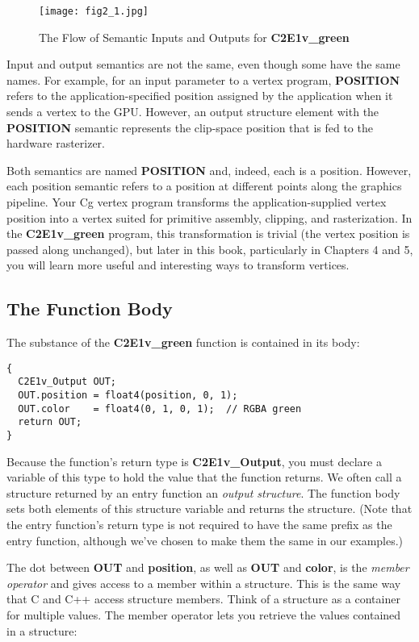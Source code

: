 \documentclass[../main.tex]{subfiles}
\begin{document}
\begin{figure}
    \centering
    \texttt{[image: fig2\_1.jpg]}
    \caption{The Flow of Semantic Inputs and Outputs for \textbf{C2E1v_green}}
    \label{fig:2-1}
\end{figure}

Input and output semantics are not the same, even though some have the same names. For example, for an input parameter to a vertex program, \textbf{POSITION} refers to the application-specified position assigned by the application when it sends a vertex to the GPU. However, an output structure element with the \textbf{POSITION} semantic represents the clip-space position that is fed to the hardware rasterizer.

Both semantics are named \textbf{POSITION} and, indeed, each is a position. However, each position semantic refers to a position at different points along the graphics pipeline. Your Cg vertex program transforms the application-supplied vertex position into a vertex suited for primitive assembly, clipping, and rasterization. In the \textbf{C2E1v_green} program, this transformation is trivial (the vertex position is passed along unchanged), but later in this book, particularly in Chapters 4 and 5, you will learn more useful and interesting ways to transform vertices.

\subsection{The Function Body}

The substance of the \textbf{C2E1v_green} function is contained in its body:

\FloatBarrier
\begin{lstlisting}
{
  C2E1v_Output OUT;
  OUT.position = float4(position, 0, 1);
  OUT.color    = float4(0, 1, 0, 1);  // RGBA green
  return OUT;
}
\end{lstlisting}
\FloatBarrier

Because the function's return type is \textbf{C2E1v_Output}, you must declare a variable of this type to hold the value that the function returns. We often call a structure returned by an entry function an \textit{output structure}. The function body sets both elements of this structure variable and returns the structure. (Note that the entry function's return type is not required to have the same prefix as the entry function, although we've chosen to make them the same in our examples.)

The dot between \textbf{OUT} and \textbf{position}, as well as \textbf{OUT} and \textbf{color}, is the \textit{member operator} and gives access to a member within a structure. This is the same way that C and C++ access structure members. Think of a structure as a container for multiple values. The member operator lets you retrieve the values contained in a structure:
\end{document}
